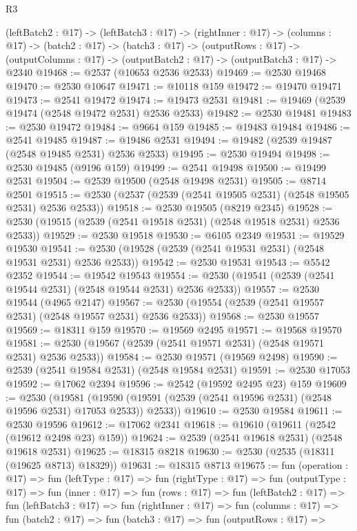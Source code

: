 \begin{lexlean}{R3}
\begin{coremodule}
  (leftBatch2 : @17) ->
  (leftBatch3 : @17) ->
  (rightInner : @17) ->
  (columns : @17) ->
  (batch2 : @17) ->
  (batch3 : @17) ->
  (outputRows : @17) ->
  (outputColumns : @17) -> (outputBatch2 : @17) -> (outputBatch3 : @17) -> @2340
@19468 := @2537 (@10653 @2536 @2533)
@19469 := @2530 @19468
@19470 := @2530 @10647
@19471 := @10118 @159
@19472 := @19470 @19471
@19473 := @2541 @19472
@19474 := @19473 @2531
@19481 := @19469 (@2539 @19474 (@2548 @19472 @2531) @2536 @2533)
@19482 := @2530 @19481
@19483 := @2530 @19472
@19484 := @9664 @159
@19485 := @19483 @19484
@19486 := @2541 @19485
@19487 := @19486 @2531
@19494 := @19482 (@2539 @19487 (@2548 @19485 @2531) @2536 @2533)
@19495 := @2530 @19494
@19498 := @2530 @19485 (@9196 @159)
@19499 := @2541 @19498
@19500 := @19499 @2531
@19504 := @2539 @19500 (@2548 @19498 @2531)
@19505 := @8714 @2501
@19515 := @2530 (@2537 (@2539 (@2541 @19505 @2531) (@2548 @19505 @2531) @2536 @2533))
@19518 := @2530 @19505 (@8219 @2345)
@19528 := @2530 (@19515 (@2539 (@2541 @19518 @2531) (@2548 @19518 @2531) @2536 @2533))
@19529 := @2530 @19518
@19530 := @6105 @2349
@19531 := @19529 @19530
@19541 := @2530 (@19528 (@2539 (@2541 @19531 @2531) (@2548 @19531 @2531) @2536 @2533))
@19542 := @2530 @19531
@19543 := @5542 @2352
@19544 := @19542 @19543
@19554 := @2530 (@19541 (@2539 (@2541 @19544 @2531) (@2548 @19544 @2531) @2536 @2533))
@19557 := @2530 @19544 (@4965 @2147)
@19567 := @2530 (@19554 (@2539 (@2541 @19557 @2531) (@2548 @19557 @2531) @2536 @2533))
@19568 := @2530 @19557
@19569 := @18311 @159
@19570 := @19569 @2495
@19571 := @19568 @19570
@19581 := @2530 (@19567 (@2539 (@2541 @19571 @2531) (@2548 @19571 @2531) @2536 @2533))
@19584 := @2530 @19571 (@19569 @2498)
@19590 := @2539 (@2541 @19584 @2531) (@2548 @19584 @2531)
@19591 := @2530 @17053
@19592 := @17062 @2394
@19596 := @2542 (@19592 @2495 @23) @159
@19609 := @2530
    (@19581 (@19590 (@19591 (@2539 (@2541 @19596 @2531) (@2548 @19596 @2531) @17053 @2533)) @2533))
@19610 := @2530 @19584
@19611 := @2530 @19596
@19612 := @17062 @2341
@19618 := @19610 (@19611 (@2542 (@19612 @2498 @23) @159))
@19624 := @2539 (@2541 @19618 @2531) (@2548 @19618 @2531)
@19625 := @18315 @8218
@19630 := @2530 (@2535 (@18311 (@19625 @8713) @18329))
@19631 := @18315 @8713
@19675 := fun (operation : @17) =>
  fun (leftType : @17) =>
  fun (rightType : @17) =>
  fun (outputType : @17) =>
  fun (inner : @17) =>
  fun (rows : @17) =>
  fun (leftBatch2 : @17) =>
  fun (leftBatch3 : @17) =>
  fun (rightInner : @17) =>
  fun (columns : @17) =>
  fun (batch2 : @17) =>
  fun (batch3 : @17) =>
  fun (outputRows : @17) =>

\end{coremodule}
\end{lexlean}
